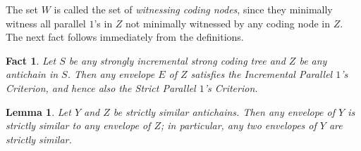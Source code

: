 \documentclass{amsart}
\newtheorem{lem}[thm]{Lemma}
\newtheorem{fact}[thm]{Fact}
\theoremstyle{remark}
\theoremstyle{definition}
\theoremstyle{remark}
\newcommand{\SPOC}{Strict Parallel $1$'s Criterion}
\newcommand{\IPOC}{Incremental Parallel $1$'s Criterion}
\begin{document}
The set $W$ is called the set of {\em witnessing coding nodes}, since they minimally witness all parallel $1$'s in $Z$  not minimally witnessed  by any coding node  in $Z$.
The next fact follows immediately from the definitions.


\begin{fact}\label{fact.Claim1}
Let $S$ be any  strongly incremental strong coding tree and
 $Z$ be any antichain  in  $S$.
Then any envelope $E$ of $Z$
satisfies the \IPOC,
and hence also the \SPOC.
\end{fact}



\begin{lem}\label{lem.envelopesbehave}
Let $Y$ and $Z$ be strictly similar  antichains.
Then  any envelope of $Y$ is strictly similar to any envelope of $Z$;
in particular, any two envelopes of $Y$ are strictly similar.
\end{lem}
\end{document}
